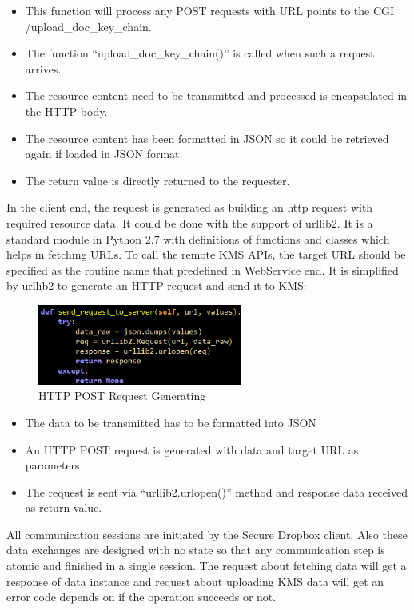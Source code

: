 \begin{itemize}
  \item
  This function will process any POST requests with URL points to the CGI /upload\_doc\_key\_chain.
  \item
  The function ``upload\_doc\_key\_chain()'' is called when such a request arrives.
  \item
  The resource content need to be transmitted and processed is encapsulated in the HTTP body.
  \item
  The resource content has been formatted in JSON so it could be retrieved again if loaded in JSON format.
  \item
  The return value is directly returned to the requester.
\end{itemize}

In the client end, the request is generated as building an http request with required resource data. It could be done with the support of urllib2. It is a standard module in Python 2.7 with definitions of functions and classes which helps in fetching URLs. To call the remote KMS APIs, the target URL should be specified as the routine name that predefined in WebService end. It is simplified by urllib2 to generate an HTTP request and send it to KMS:

\begin{figure}[h]
        \centering
        \includegraphics[width=0.6\textwidth]{figures/HTTP_POST_Request_Generation.png}
        \caption[HTTP POST Request Generating] {HTTP POST Request Generating}
\end{figure}

\begin{itemize}
  \item
  The data to be transmitted has to be formatted into JSON
  \item
  An HTTP POST request is generated with data and target URL as parameters
  \item
  The request is sent via ``urllib2.urlopen()'' method and response data received as return value.
\end{itemize}

All communication sessions are initiated by the Secure Dropbox client. Also these data exchanges are designed with no state so that any communication step is atomic and finished in a single session. The request about fetching data will get a response of data instance and request about uploading KMS data will get an error code depends on if the operation succeeds or not.

